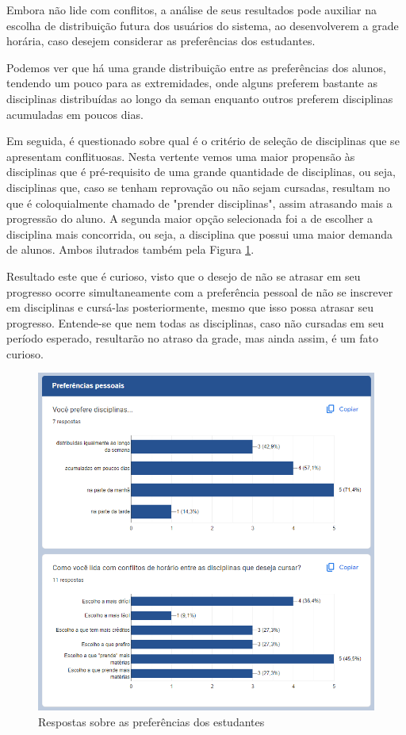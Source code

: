         Embora não lide com conflitos, a análise de seus resultados pode auxiliar na escolha de distribuição futura dos usuários do sistema, ao desenvolverem a grade horária, caso desejem considerar as preferências dos estudantes.

        Podemos ver que há uma grande distribuição entre as preferências dos alunos, tendendo um pouco para as extremidades, onde alguns preferem bastante as disciplinas distribuídas ao longo da seman enquanto outros preferem disciplinas acumuladas em poucos dias.

        Em seguida, é questionado sobre qual é o critério de seleção de disciplinas que se apresentam conflituosas. Nesta vertente vemos uma maior propensão às disciplinas que é pré-requisito de uma grande quantidade de disciplinas, ou seja, disciplinas que, caso se tenham reprovação ou não sejam cursadas, resultam no que é coloquialmente chamado de "prender disciplinas", assim atrasando mais a progressão do aluno. A segunda maior opção selecionada foi a de escolher a disciplina mais concorrida, ou seja, a disciplina que possui uma maior demanda de alunos. Ambos ilutrados também pela Figura \ref{fig:3_Preferencias}.

        Resultado este que é curioso, visto que o desejo de não se atrasar em seu progresso ocorre simultaneamente com a preferência pessoal de não se inscrever em disciplinas e cursá-las posteriormente, mesmo que isso possa atrasar seu progresso. Entende-se que nem todas as disciplinas, caso não cursadas em seu período esperado, resultarão no atraso da grade, mas ainda assim, é um fato curioso.

        \begin{figure}[htbp]\centering
            \caption{\label{fig:3_Preferencias} Respostas sobre as preferências dos estudantes}
            \includegraphics[scale=0.8]{files/img/forms/3.0-PreferenciasPessoais.png}
        \end{figure} %

